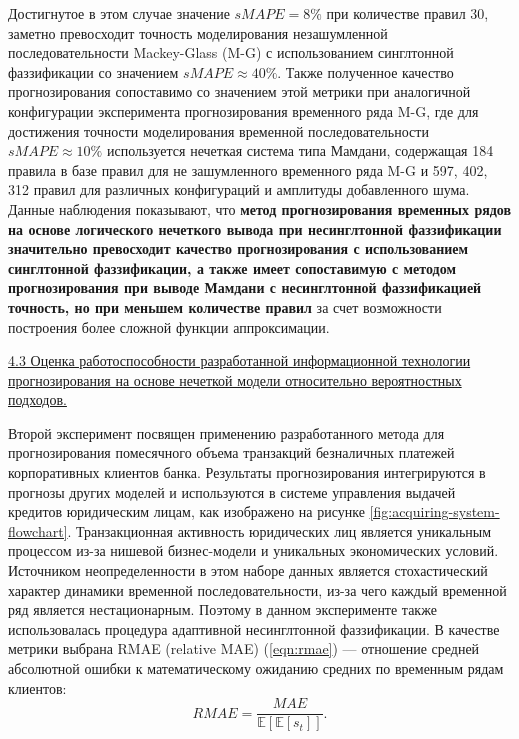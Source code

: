 %
Достигнутое в этом случае значение $sMAPE = 8\%$ при количестве правил 30, заметно превосходит точность моделирования незашумленной последовательности Mackey-Glass (M-G) с использованием синглтонной фаззификации со значением $sMAPE \approx 40\%$. Также полученное качество прогнозирования сопоставимо со значением этой метрики при аналогичной конфигурации эксперимента прогнозирования временного ряда M-G, где для достижения точности моделирования временной последовательности $sMAPE \approx 10\%$ используется нечеткая система типа Мамдани, содержащая 184 правила в базе правил для не зашумленного временного ряда M-G и 597, 402, 312 правил для различных конфигураций и амплитуды добавленного шума. Данные наблюдения показывают, что \textbf{метод прогнозирования временных рядов на основе логического нечеткого вывода при несинглтонной фаззификации значительно превосходит качество прогнозирования с использованием синглтонной фаззификации, а также имеет сопоставимую с методом прогнозирования при выводе Мамдани с несинглтонной фаззификацией точность, но при меньшем количестве правил} за счет возможности построения более сложной функции аппроксимации.


\ul{4.3 Оценка работоспособности разработанной информационной технологии прогнозирования на основе нечеткой модели относительно вероятностных подходов.}

Второй эксперимент посвящен применению разработанного метода для прогнозирования помесячного объема транзакций безналичных платежей корпоративных клиентов банка. Результаты прогнозирования интегрируются в прогнозы других моделей и используются в системе управления выдачей кредитов юридическим лицам, как изображено на рисунке \cref{fig:acquiring-system-flowchart}. Транзакционная активность юридических лиц является уникальным процессом из-за нишевой бизнес-модели и уникальных экономических условий. Источником неопределенности в этом наборе данных является стохастический характер динамики временной последовательности, из-за чего каждый временной ряд является нестационарным. Поэтому в данном эксперименте также использовалась процедура адаптивной несинглтонной фаззификации. В качестве метрики выбрана RMAE (relative MAE) (\ref{eqn:rmae}) --- отношение средней абсолютной ошибки к математическому ожиданию средних по временным рядам клиентов:
\begin{equation}
\label{eqn:rmae}
RMAE = \frac{MAE}{\mathbb{E}[\mathbb{E}[s_t]]}.
\end{equation}

